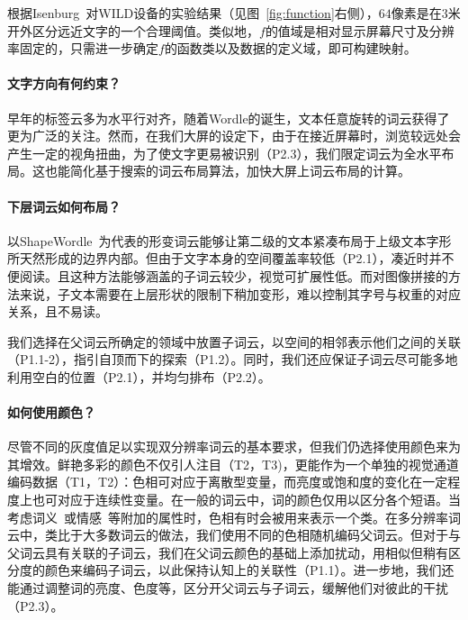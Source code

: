 根据Isenburg~\supercite{Isenberg2013}对WILD设备的实验结果（见图~\ref{fig:function}右侧），$64$像素是在$3$米开外区分远近文字的一个合理阈值。类似地，$f$的值域是相对显示屏幕尺寸及分辨率固定的，只需进一步确定$f$的函数类以及数据的定义域，即可构建映射。

\paragraph{文字方向有何约束？}早年的标签云多为水平行对齐，随着Wordle的诞生，文本任意旋转的词云获得了更为广泛的关注。然而，在我们大屏的设定下，由于在接近屏幕时，浏览较远处会产生一定的视角扭曲，为了使文字更易被识别（P2.3），我们限定词云为全水平布局。这也能简化基于搜索的词云布局算法，加快大屏上词云布局的计算。

\paragraph{下层词云如何布局？}

以ShapeWordle~\supercite{Wang2020}为代表的形变词云能够让第二级的文本紧凑布局于上级文本字形所天然形成的边界内部。但由于文字本身的空间覆盖率较低（P2.1），凑近时并不便阅读。且这种方法能够涵盖的子词云较少，视觉可扩展性低。而对图像拼接的方法来说，子文本需要在上层形状的限制下稍加变形，难以控制其字号与权重的对应关系，且不易读。

我们选择在父词云所确定的领域中放置子词云，以空间的相邻表示他们之间的关联（P1.1-2），指引自顶而下的探索（P1.2）。同时，我们还应保证子词云尽可能多地利用空白的位置（P2.1），并均匀排布（P2.2）。

\paragraph{如何使用颜色？}

尽管不同的灰度值足以实现双分辨率词云的基本要求，但我们仍选择使用颜色来为其增效。鲜艳多彩的颜色不仅引人注目（T2，T3)，更能作为一个单独的视觉通道编码数据（T1，T2）：色相可对应于离散型变量，而亮度或饱和度的变化在一定程度上也可对应于连续性变量。在一般的词云中，词的颜色仅用以区分各个短语。当考虑词义~\supercite{Barth2014,Hearst2019}或情感~\supercite{Kulahcioglu2019}等附加的属性时，色相有时会被用来表示一个类。在多分辨率词云中，类比于大多数词云的做法，我们使用不同的色相随机编码父词云。但对于与父词云具有关联的子词云，我们在父词云颜色的基础上添加扰动，用相似但稍有区分度的颜色来编码子词云，以此保持认知上的关联性（P1.1）。进一步地，我们还能通过调整词的亮度、色度等，区分开父词云与子词云，缓解他们对彼此的干扰（P2.3）。


